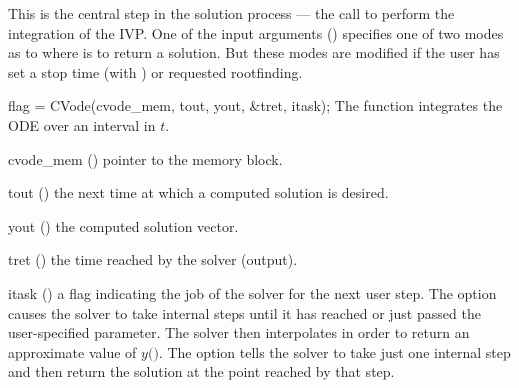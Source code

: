 This is the central step in the solution process --- the call to
perform the integration of the IVP.  One of the input arguments ()
specifies one of two modes as to where {\cvode} is to return a solution.
But these modes are modified if the user has set a stop time (with
) or requested rootfinding.

%
{
  flag = CVode(cvode\_mem, tout, yout, \&tret, itask);
}
{
  The function  integrates the ODE over an interval in $t$.
}
{
  \begin{args}
  \item[cvode\_mem] ()
    pointer to the {\cvode} memory block.
  \item[tout] ()
    the next time at which a computed solution is desired.
  \item[yout] ()
    the computed solution vector.
  \item[tret] ()
    the time reached by the solver (output).
  \item[itask] ()
    a flag indicating the job of the solver for the next user step.
    The  option causes the solver to take internal steps until
    it has reached or just passed the user-specified 
    parameter. The solver then interpolates in order to
    return an approximate value of $y($$)$.
    The  option tells the solver to take just one internal step
    and then return the solution at the point reached by that step.
  \end{args}
}
